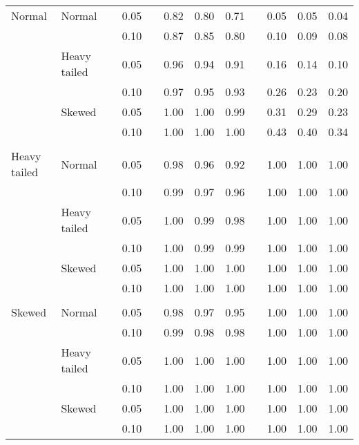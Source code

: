 \begin{table}[ht]
\begin{scriptsize}
\begin{tabular}{ll p{.1cm} c p{.1cm} rrr p{.1cm} rrr}
\rowcolor{gray!20} Normal       & Normal       && 0.05 &&   0.82 & 0.80 & 0.71 && 0.05 & 0.05 & 0.04 \\ 
\rowcolor{gray!20}             &              && 0.10 &&   0.87 & 0.85 & 0.80 && 0.10 & 0.09 & 0.08 \\ 
\rowcolor{gray!20}             & Heavy tailed && 0.05 &&   0.96 & 0.94 & 0.91 && 0.16 & 0.14 & 0.10 \\ 
\rowcolor{gray!20}             &              && 0.10 &&   0.97 & 0.95 & 0.93 && 0.26 & 0.23 & 0.20 \\ 
\rowcolor{gray!20}             & Skewed       && 0.05 &&   1.00 & 1.00 & 0.99 && 0.31 & 0.29 & 0.23 \\ 
\rowcolor{gray!20}             &              && 0.10 &&   1.00 & 1.00 & 1.00 && 0.43 & 0.40 & 0.34 \\ 
             &&&&&&&&&&&\\
Heavy tailed & Normal       && 0.05 &&   0.98 & 0.96 & 0.92 && 1.00 & 1.00 & 1.00 \\ 
             &              && 0.10 &&   0.99 & 0.97 & 0.96 && 1.00 & 1.00 & 1.00 \\ 
             & Heavy tailed && 0.05 &&   1.00 & 0.99 & 0.98 && 1.00 & 1.00 & 1.00 \\ 
             &              && 0.10 &&   1.00 & 0.99 & 0.99 && 1.00 & 1.00 & 1.00 \\ 
             & Skewed       && 0.05 &&   1.00 & 1.00 & 1.00 && 1.00 & 1.00 & 1.00 \\ 
             &              && 0.10 &&   1.00 & 1.00 & 1.00 && 1.00 & 1.00 & 1.00 \\ 
             &&&&&&&&&&&\\
Skewed       & Normal       && 0.05 &&   0.98 & 0.97 & 0.95 && 1.00 & 1.00 & 1.00 \\ 
             &              && 0.10 &&   0.99 & 0.98 & 0.98 && 1.00 & 1.00 & 1.00 \\ 
             & Heavy tailed && 0.05 &&   1.00 & 1.00 & 1.00 && 1.00 & 1.00 & 1.00 \\ 
             &              && 0.10 &&   1.00 & 1.00 & 1.00 && 1.00 & 1.00 & 1.00 \\ 
             & Skewed       && 0.05 &&   1.00 & 1.00 & 1.00 && 1.00 & 1.00 & 1.00 \\ 
             &              && 0.10 &&   1.00 & 1.00 & 1.00 && 1.00 & 1.00 & 1.00 \\ 


   \hline
\end{tabular}
\end{scriptsize}
\end{table}


